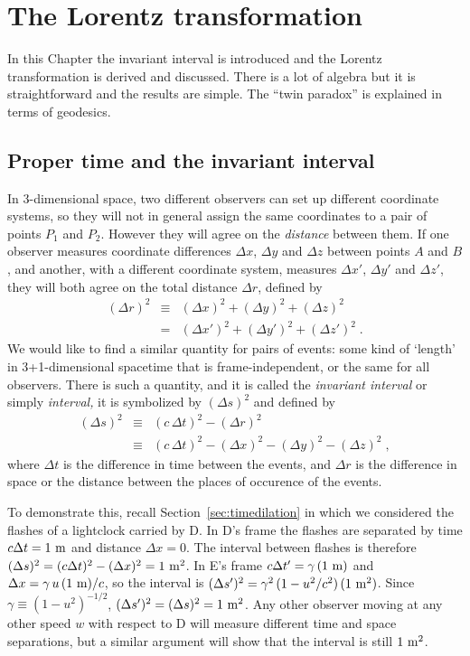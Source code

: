 \chapter{The Lorentz transformation}
\label{chap:lorentz}

In this Chapter the invariant interval is introduced and the Lorentz
transformation is derived and discussed.  There is a lot of algebra
but it is straightforward and the results are simple.  The ``twin
paradox'' is explained in terms of geodesics.


\section{Proper time and the invariant interval}
\label{sec:interval}

In 3-dimensional space, two different observers can set up different
coordinate systems, so they will not in general assign the same
coordinates to a pair of points $P_1$ and $P_2$. However they will
agree on the {\em distance\/} between them.  If one observer measures
coordinate differences $\Delta x$, $\Delta y$ and $\Delta z$ between
points $A$ and $B$, and another, with a different coordinate system,
measures $\Delta x'$, $\Delta y'$ and $\Delta z'$, they will both
agree on the total distance $\Delta r$, defined by
\begin{eqnarray}
(\Delta r)^2 & \equiv & (\Delta x)^2 + (\Delta y)^2 + (\Delta z)^2 \nonumber\\
             & = & (\Delta x')^2 + (\Delta y')^2 + (\Delta z')^2 \; .
\end{eqnarray}
We would like to find a similar quantity for pairs of events: some
kind of `length' in 3+1-dimensional spacetime that is
frame-independent, or the same for all observers.  There is such a
quantity, and it is called the {\em invariant interval\/} or simply
{\em interval,\/} it is symbolized by $(\Delta s)^2$ and defined by
\begin{eqnarray}
(\Delta s)^2 & \equiv & (c\,\Delta t)^2 - (\Delta r)^2 \nonumber\\
& \equiv & (c\,\Delta t)^2 - (\Delta x)^2 - (\Delta y)^2 - (\Delta z)^2 \; ,
\end{eqnarray}
where $\Delta t$ is the difference in time between the events, and
$\Delta r$ is the difference in space or the distance between the
places of occurence of the events.

To demonstrate this, recall Section~\ref{sec:timedilation} in which we
considered the flashes of a lightclock carried by D.  In D's frame the
flashes are separated by time $c\Delta t=1~{\rm m}$ and distance
$\Delta x=0$.  The interval between flashes is therefore $(\Delta
s)^2=(c\Delta t)^2-(\Delta x)^2=1~{\rm m^2}$.  In E's frame $c\Delta
t'=\gamma\,(1~{\rm m})$ and $\Delta x=\gamma\,u\,(1~{\rm m})/c$, so
the interval is $(\Delta s')^2=\gamma^2\,(1-u^2/c^2)\,(1~{\rm m^2})$.
Since $\gamma\equiv (1-u^2)^{-1/2}$, $(\Delta s')^2=(\Delta
s)^2=1~{\rm m^2}$.  Any other observer moving at any other speed $w$
with respect to D will measure different time and space separations,
but a similar argument will show that the interval is still $1~{\rm
m^2}$.

